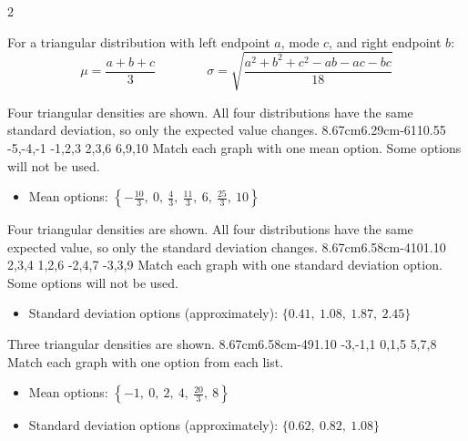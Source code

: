 \begin{multicols}{2}
		
		\vspace{-0.35cm}
		For a triangular distribution with left endpoint $a$, mode $c$, and right endpoint $b$:
		\[
		\mu=\frac{a+b+c}{3}
		\qquad \qquad
		\sigma=\sqrt{\frac{a^2+b^2+c^2-ab-ac-bc}{18}}
		\]
		
		\vspace{-0.35cm}
		Four triangular densities are shown. All four distributions have the same standard deviation, so only the expected value changes.
		\vspace{-0.7cm}
		\TriangularFourGraph
		{8.67cm}{6.29cm}{-6}{11}{0.55}
		{-5,-4,-1}
		{-1,2,3}
		{2,3,6}
		{6,9,10}
		Match each graph with one mean option. Some options will not be used.
		\begin{itemize}
			\item Mean options: $\left\{-\frac{10}{3},\ 0,\ \frac{4}{3},\ \frac{11}{3},\ 6,\ \frac{25}{3},\ 10\right\}$
		\end{itemize}
		
		\vspace{-0.35cm}
		Four triangular densities are shown. All four distributions have the same expected value, so only the standard deviation changes.
		\vspace{-0.7cm}
		\TriangularFourGraph
		{8.67cm}{6.58cm}{-4}{10}{1.10}
		{2,3,4}
		{1,2,6}
		{-2,4,7}
		{-3,3,9}
		Match each graph with one standard deviation option. Some options will not be used.
		\begin{itemize}
			\item Standard deviation options (approximately): $\{0.41,\ 1.08,\ 1.87,\ 2.45\}$
		\end{itemize}
		
		\vspace{-0.35cm}
		Three triangular densities are shown.
		\vspace{-0.7cm}
		\TriangularThreeGraph
		{8.67cm}{6.58cm}{-4}{9}{1.10}
		{-3,-1,1}
		{0,1,5}
		{5,7,8}
		Match each graph with one option from each list.
		\begin{itemize}
			\item Mean options: $\left\{-1,\ 0,\ 2,\ 4,\ \frac{20}{3},\ 8\right\}$
			\item Standard deviation options (approximately): $\{0.62,\ 0.82,\ 1.08\}$
		\end{itemize}
		

\end{multicols}
